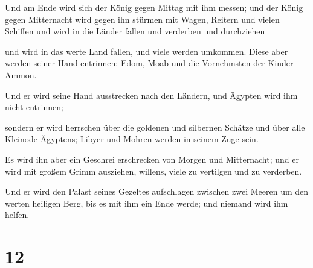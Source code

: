  Und am Ende wird sich der König gegen Mittag mit ihm
messen; und der König gegen Mitternacht wird gegen ihn stürmen mit
Wagen, Reitern und vielen Schiffen und wird in die Länder fallen und
verderben und durchziehen

 und wird in das werte Land fallen, und viele werden
umkommen. Diese aber werden seiner Hand entrinnen: Edom, Moab und die
Vornehmsten der Kinder Ammon.

 Und er wird seine Hand ausstrecken nach den Ländern, und
Ägypten wird ihm nicht entrinnen;

 sondern er wird herrschen über die goldenen und
silbernen Schätze und über alle Kleinode Ägyptens; Libyer und Mohren
werden in seinem Zuge sein.

 Es wird ihn aber ein Geschrei erschrecken von Morgen und
Mitternacht; und er wird mit großem Grimm ausziehen, willens, viele zu
vertilgen und zu verderben.

 Und er wird den Palast seines Gezeltes aufschlagen
zwischen zwei Meeren um den werten heiligen Berg, bis es mit ihm ein
Ende werde; und niemand wird ihm helfen.

\hypertarget{section-11}{%
\section{12}\label{section-11}}

